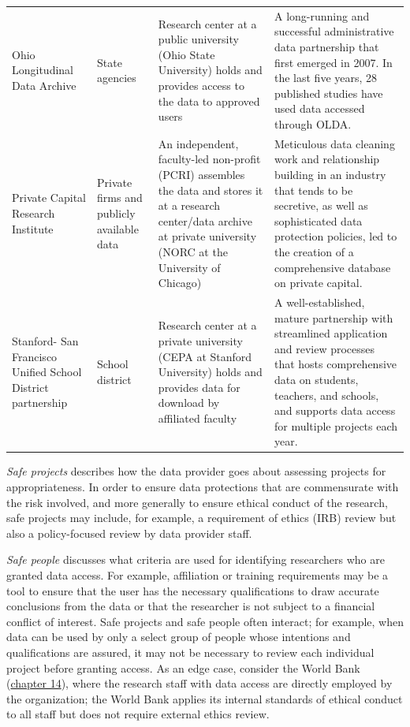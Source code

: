 \documentclass[
]{book}
\begin{document}
\begin{table}
\begin{tabular}[t]{>{\raggedright\arraybackslash}p{10em}>{\raggedright\arraybackslash}p{10em}>{\raggedright\arraybackslash}p{20em}>{\raggedright\arraybackslash}p{30em}}
Ohio Longitudinal Data Archive & State agencies & Research center at a public university (Ohio State University) holds and provides access to the data to approved users & A long-running and successful administrative data partnership that first emerged in 2007. In the last five years, 28 published studies have used data accessed through OLDA.\\
Private Capital Research Institute & Private firms and publicly available data & An independent, faculty-led non-profit (PCRI) assembles the data and stores it at a research center/data archive at private university (NORC at the University of Chicago) & Meticulous data cleaning work and relationship building in an industry that tends to be secretive, as well as sophisticated data protection policies, led to the creation of a comprehensive database on private capital.\\
Stanford- San Francisco Unified School District partnership & School district & Research center at a private university (CEPA at Stanford University) holds and provides data for download by affiliated faculty & A well-established, mature partnership with streamlined application and review processes that hosts comprehensive data on students, teachers, and schools, and supports data access for multiple projects each year.\\
\bottomrule
\end{tabular}
\end{table}

\emph{Safe projects} describes how the data provider goes about assessing projects for appropriateness. In order to ensure data protections that are commensurate with the risk involved, and more generally to ensure ethical conduct of the research, safe projects may include, for example, a requirement of ethics (IRB) review but also a policy-focused review by data provider staff.

\emph{Safe people} discusses what criteria are used for identifying researchers who are granted data access. For example, affiliation or training requirements may be a tool to ensure that the user has the necessary qualifications to draw accurate conclusions from the data or that the researcher is not subject to a financial conflict of interest. Safe projects and safe people often interact; for example, when data can be used by only a select group of people whose intentions and qualifications are assured, it may not be necessary to review each individual project before granting access. As an edge case, consider the World Bank (\protect\hyperlink{dime}{chapter 14}), where the research staff with data access are directly employed by the organization; the World Bank applies its internal standards of ethical conduct to all staff but does not require external ethics review.
\end{document}
